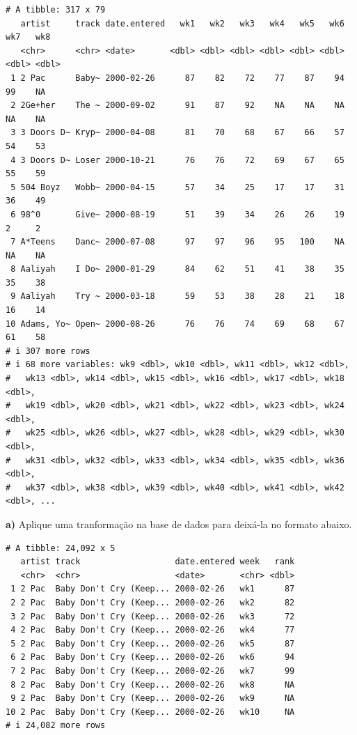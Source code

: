 \documentclass[
  portuguese,
  letterpaper,
  DIV=11,
  numbers=noendperiod]{scrreprt}
\theoremstyle{definition}
\theoremstyle{remark}
\begin{document}
\begin{verbatim}
# A tibble: 317 x 79
   artist     track date.entered   wk1   wk2   wk3   wk4   wk5   wk6   wk7   wk8
   <chr>      <chr> <date>       <dbl> <dbl> <dbl> <dbl> <dbl> <dbl> <dbl> <dbl>
 1 2 Pac      Baby~ 2000-02-26      87    82    72    77    87    94    99    NA
 2 2Ge+her    The ~ 2000-09-02      91    87    92    NA    NA    NA    NA    NA
 3 3 Doors D~ Kryp~ 2000-04-08      81    70    68    67    66    57    54    53
 4 3 Doors D~ Loser 2000-10-21      76    76    72    69    67    65    55    59
 5 504 Boyz   Wobb~ 2000-04-15      57    34    25    17    17    31    36    49
 6 98^0       Give~ 2000-08-19      51    39    34    26    26    19     2     2
 7 A*Teens    Danc~ 2000-07-08      97    97    96    95   100    NA    NA    NA
 8 Aaliyah    I Do~ 2000-01-29      84    62    51    41    38    35    35    38
 9 Aaliyah    Try ~ 2000-03-18      59    53    38    28    21    18    16    14
10 Adams, Yo~ Open~ 2000-08-26      76    76    74    69    68    67    61    58
# i 307 more rows
# i 68 more variables: wk9 <dbl>, wk10 <dbl>, wk11 <dbl>, wk12 <dbl>,
#   wk13 <dbl>, wk14 <dbl>, wk15 <dbl>, wk16 <dbl>, wk17 <dbl>, wk18 <dbl>,
#   wk19 <dbl>, wk20 <dbl>, wk21 <dbl>, wk22 <dbl>, wk23 <dbl>, wk24 <dbl>,
#   wk25 <dbl>, wk26 <dbl>, wk27 <dbl>, wk28 <dbl>, wk29 <dbl>, wk30 <dbl>,
#   wk31 <dbl>, wk32 <dbl>, wk33 <dbl>, wk34 <dbl>, wk35 <dbl>, wk36 <dbl>,
#   wk37 <dbl>, wk38 <dbl>, wk39 <dbl>, wk40 <dbl>, wk41 <dbl>, wk42 <dbl>, ...
\end{verbatim}

\textbf{a)} Aplique uma tranformação na base de dados para deixá-la no
formato abaixo.

\begin{verbatim}
# A tibble: 24,092 x 5
   artist track                   date.entered week   rank
   <chr>  <chr>                   <date>       <chr> <dbl>
 1 2 Pac  Baby Don't Cry (Keep... 2000-02-26   wk1      87
 2 2 Pac  Baby Don't Cry (Keep... 2000-02-26   wk2      82
 3 2 Pac  Baby Don't Cry (Keep... 2000-02-26   wk3      72
 4 2 Pac  Baby Don't Cry (Keep... 2000-02-26   wk4      77
 5 2 Pac  Baby Don't Cry (Keep... 2000-02-26   wk5      87
 6 2 Pac  Baby Don't Cry (Keep... 2000-02-26   wk6      94
 7 2 Pac  Baby Don't Cry (Keep... 2000-02-26   wk7      99
 8 2 Pac  Baby Don't Cry (Keep... 2000-02-26   wk8      NA
 9 2 Pac  Baby Don't Cry (Keep... 2000-02-26   wk9      NA
10 2 Pac  Baby Don't Cry (Keep... 2000-02-26   wk10     NA
# i 24,082 more rows
\end{verbatim}
\end{document}
